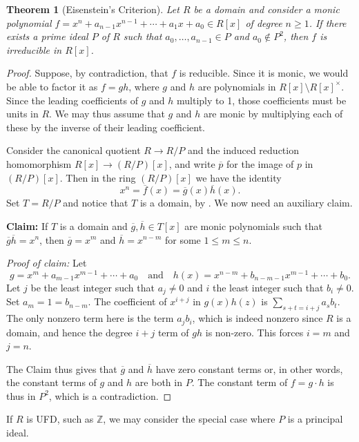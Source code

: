\documentclass[12pt]{report}
\newtheorem{theorem}{Theorem}[chapter]
\numberwithin{equation}{section}
\numberwithin{theorem}{chapter}
\theoremstyle{definition}
\newtheorem*{basic properties}{Basic Properties}
\newtheorem*{Important Remark}{Important Remark}
\begin{document}
\begin{theorem}[Eisenstein's Criterion]  
Let $R$ be a domain and consider a monic polynomial $f = x^n + a_{n-1} x^{n-1} + \cdots + a_1 x + a_0 \in R[x]$ of degree $n \geqslant 1$. If there exists a prime ideal $P$ of $R$ such that $a_0, \dots, a_{n-1} \in P$ and $a_0 \notin P^2$, then $f$ is irreducible in $R[x]$.
\end{theorem}

\begin{proof} 
Suppose, by contradiction, that $f$ is reducible. Since it is monic, we would be able to factor it as $f = gh$, where $g$ and $h$ are polynomials in $R[x]\setminus R[x]^\times$. Since the leading coefficients of $g$ and $h$ multiply to 1, those coefficients must be units in $R$. We may thus assume that $g$ and $h$ are monic by multiplying each of these by the inverse of their leading coefficient.

Consider the canonical quotient $R \to R/P$ and the induced reduction homomorphism $R[x] \to (R/P)[x]$, and write $\overline{p}$ for the image of $p$ in $(R/P)[x]$. Then in the ring $(R/P)[x]$ we have the identity 
$$x^n = \overline{f}(x) = \overline{g}(x)\overline{h}(x).$$ 
Set $T=R/P$ and notice that $T$ is a domain, by . We now need an auxiliary claim.

{\bf Claim:} If $T$ is a domain and $\overline{g}, \overline{h} \in T[x]$ are monic polynomials such that $\overline{g} \overline{h} = x^n$, then $\overline{g} = x^m$ and $\overline{h} = x^{n-m}$ for some $1 \leqslant m \leqslant n$.

{\em Proof of claim:}  Let 
$$g = x^m + a_{m-1} x^{m-1} + \cdots + a_0 \quad \text{and} \quad h(x) = x^{n-m} + b_{n-m-1} x^{m-1} + \cdots +  b_0.$$ 
Let $j$ be the least integer such that $a_j \neq 0$ and $i$ the least integer such that $b_i \neq 0$. Set $a_m =1 = b_{n-m}$.
The coefficient of $x^{i+j}$ in $g(x) h(z)$ is $\sum_{s + t = i +j} a_s b_t$. The only nonzero term here is the term $a_j b_i$, which is indeed nonzero since $R$ is a domain, and hence the degree $i+j$ term of $g h$ is non-zero. This forces $i = m$ and  $j = n$.

The Claim thus gives that $\overline{g}$ and $\overline{h}$ have zero constant terms or, in other words, the constant terms of $g$ and $h$ are both in $P$. The constant term of $f = g \cdot h$ is thus in $P^2$, which is a contradiction.
\end{proof}


If $R$ is UFD, such as $\mathbb{Z}$, we may consider the special case where $P$ is a principal ideal.
\end{document}
